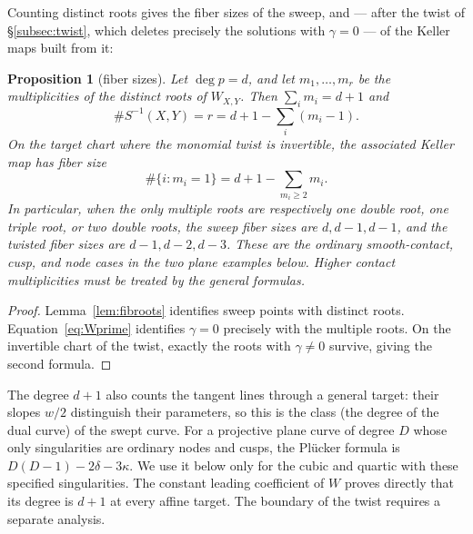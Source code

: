\documentclass[11pt]{article}
\numberwithin{equation}{section}
\theoremstyle{plain}
\newtheorem{proposition}[theorem]{Proposition}
\theoremstyle{definition}
\theoremstyle{remark}
\begin{document}
Counting distinct roots gives the fiber sizes of the sweep, and --- after the
twist of \S\ref{subsec:twist}, which deletes precisely the solutions with
$\gamma=0$ --- of the Keller maps built from it:

\begin{proposition}[fiber sizes]\label{prop:fibsizes}
Let $\deg p=d$, and let $m_1,\ldots,m_r$ be the multiplicities of the
distinct roots of $W_{X,Y}$. Then $\sum_i m_i=d+1$ and
\[
 \#S^{-1}(X,Y)=r=d+1-\sum_i(m_i-1).
\]
On the target chart where the monomial twist is invertible, the associated
Keller map has fiber size
\[
 \#\{i:m_i=1\}=d+1-\sum_{m_i\ge2}m_i.
\]
In particular, when the only multiple roots are respectively one double
root, one triple root, or two double roots, the sweep fiber sizes are
$d,d-1,d-1$, and the twisted fiber sizes are $d-1,d-2,d-3$.
These are the ordinary smooth-contact, cusp, and node cases in the two
plane examples below. Higher contact multiplicities must be treated by
the general formulas.
\end{proposition}
\begin{proof}
Lemma~\ref{lem:fibroots} identifies sweep points with distinct roots.
Equation~\eqref{eq:Wprime} identifies $\gamma=0$ precisely with the
multiple roots. On the invertible chart of the twist, exactly the roots
with $\gamma\ne0$ survive, giving the second formula.
\end{proof}

The degree $d+1$ also counts the tangent lines through a general target:
their slopes $w/2$ distinguish their parameters, so this is the class
(the degree of the dual curve) of the swept curve. For a projective plane
curve of degree $D$ whose only singularities are ordinary nodes and cusps,
the Pl\"ucker formula is $D(D-1)-2\delta-3\kappa$. We use it below only
for the cubic and quartic with these specified singularities. The constant
leading coefficient of $W$ proves directly that its degree is $d+1$ at
every affine target. The boundary of the twist requires a separate analysis.
\end{document}
